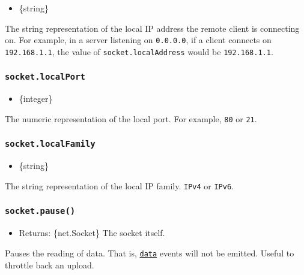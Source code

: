\begin{itemize}
\tightlist
\item
  \{string\}
\end{itemize}

The string representation of the local IP address the remote client is
connecting on. For example, in a server listening on
\texttt{\textquotesingle{}0.0.0.0\textquotesingle{}}, if a client
connects on \texttt{\textquotesingle{}192.168.1.1\textquotesingle{}},
the value of \texttt{socket.localAddress} would be
\texttt{\textquotesingle{}192.168.1.1\textquotesingle{}}.

\subsubsection{\texorpdfstring{\texttt{socket.localPort}}{socket.localPort}}\label{socket.localport}

\begin{itemize}
\tightlist
\item
  \{integer\}
\end{itemize}

The numeric representation of the local port. For example, \texttt{80}
or \texttt{21}.

\subsubsection{\texorpdfstring{\texttt{socket.localFamily}}{socket.localFamily}}\label{socket.localfamily}

\begin{itemize}
\tightlist
\item
  \{string\}
\end{itemize}

The string representation of the local IP family.
\texttt{\textquotesingle{}IPv4\textquotesingle{}} or
\texttt{\textquotesingle{}IPv6\textquotesingle{}}.

\subsubsection{\texorpdfstring{\texttt{socket.pause()}}{socket.pause()}}\label{socket.pause}

\begin{itemize}
\tightlist
\item
  Returns: \{net.Socket\} The socket itself.
\end{itemize}

Pauses the reading of data. That is,
\hyperref[event-data]{\texttt{\textquotesingle{}data\textquotesingle{}}}
events will not be emitted. Useful to throttle back an upload.

